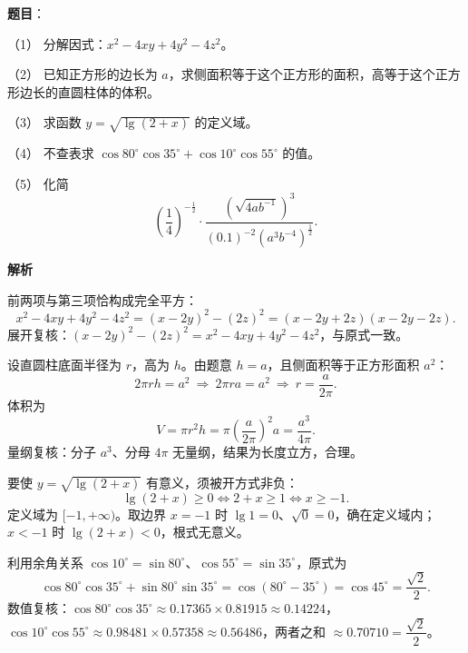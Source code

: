\begin{answer}

\textbf{题目}：

（1） 分解因式：$x^2-4xy+4y^2-4z^2$。

（2） 已知正方形的边长为 $a$，求侧面积等于这个正方形的面积，高等于这个正方形边长的直圆柱体的体积。

（3） 求函数 $y=\sqrt{\lg(2+x)}$ 的定义域。

（4） 不查表求 $\cos 80^\circ\cos 35^\circ+\cos 10^\circ\cos 55^\circ$ 的值。

（5） 化简
\nopagebreak[4]
\[
\left(\frac14\right)^{-\frac12}\cdot\frac{\left(\sqrt{4ab^{-1}}\right)^3}{(0.1)^{-2}\left(a^3b^{-4}\right)^{\frac12}}.
\]

\textbf{解析}


前两项与第三项恰构成完全平方：
\nopagebreak[4]
\[
x^2-4xy+4y^2-4z^2=(x-2y)^2-(2z)^2=(x-2y+2z)(x-2y-2z).
\]
展开复核：$(x-2y)^2-(2z)^2=x^2-4xy+4y^2-4z^2$，与原式一致。


设直圆柱底面半径为 $r$，高为 $h$。由题意 $h=a$，且侧面积等于正方形面积 $a^2$：
\nopagebreak[4]
\[
2\pi rh=a^2\ \Rightarrow\ 2\pi ra=a^2\ \Rightarrow\ r=\frac{a}{2\pi}.
\]
体积为
\nopagebreak[4]
\[
V=\pi r^2h=\pi\left(\frac{a}{2\pi}\right)^2a=\frac{a^3}{4\pi}.
\]
量纲复核：分子 $a^3$、分母 $4\pi$ 无量纲，结果为长度立方，合理。


要使 $y=\sqrt{\lg(2+x)}$ 有意义，须被开方式非负：
\nopagebreak[4]
\[
\lg(2+x)\ge0\iff 2+x\ge1\iff x\ge-1.
\]
定义域为 $[-1,+\infty)$。取边界 $x=-1$ 时 $\lg1=0$、$\sqrt0=0$，确在定义域内；$x<-1$ 时 $\lg(2+x)<0$，根式无意义。


利用余角关系 $\cos10^\circ=\sin80^\circ$、$\cos55^\circ=\sin35^\circ$，原式为
\nopagebreak[4]
\[
\cos80^\circ\cos35^\circ+\sin80^\circ\sin35^\circ=\cos(80^\circ-35^\circ)=\cos45^\circ=\frac{\sqrt2}{2}.
\]
数值复核：$\cos80^\circ\cos35^\circ\approx0.17365\times0.81915\approx0.14224$，$\cos10^\circ\cos55^\circ\approx0.98481\times0.57358\approx0.56486$，两者之和 $\approx0.70710=\dfrac{\sqrt2}{2}$。



\end{answer}
